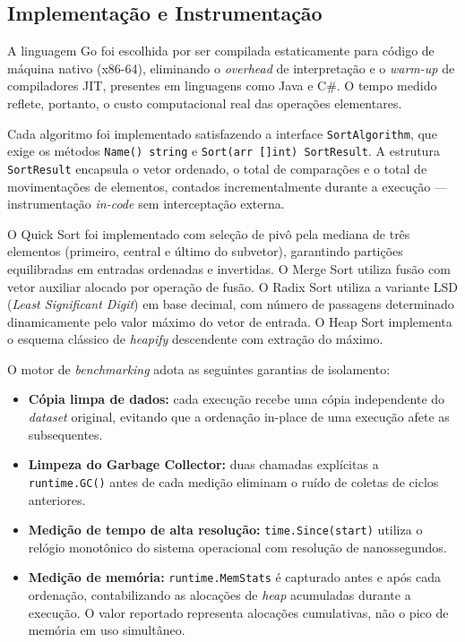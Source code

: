 \documentclass[12pt]{article}
\begin{document}
\subsection{Implementação e Instrumentação}
\label{subsec:impl}

A linguagem Go foi escolhida por ser compilada estaticamente para
código de máquina nativo (x86-64), eliminando o \textit{overhead}
de interpretação e o \textit{warm-up} de compiladores JIT,
presentes em linguagens como Java e C\#. O tempo medido reflete,
portanto, o custo computacional real das operações elementares.

Cada algoritmo foi implementado satisfazendo a interface
\texttt{SortAlgorithm}, que exige os métodos \texttt{Name() string}
e \texttt{Sort(arr []int) SortResult}. A estrutura \texttt{SortResult}
encapsula o vetor ordenado, o total de comparações e o total de
movimentações de elementos, contados incrementalmente durante a
execução --- instrumentação \textit{in-code} sem interceptação
externa.

O Quick Sort foi implementado com seleção de pivô pela mediana de
três elementos (primeiro, central e último do subvetor), garantindo
partições equilibradas em entradas ordenadas e invertidas. O Merge
Sort utiliza fusão com vetor auxiliar alocado por operação de fusão.
O Radix Sort utiliza a variante LSD (\textit{Least Significant
Digit}) em base decimal, com número de passagens determinado
dinamicamente pelo valor máximo do vetor de entrada. O Heap Sort
implementa o esquema clássico de \textit{heapify} descendente com
extração do máximo.

O motor de \textit{benchmarking} adota as seguintes garantias
de isolamento:

\begin{itemize}
  \item \textbf{Cópia limpa de dados:} cada execução recebe uma
        cópia independente do \textit{dataset} original, evitando
        que a ordenação in-place de uma execução afete as
        subsequentes.

  \item \textbf{Limpeza do Garbage Collector:} duas chamadas
        explícitas a \texttt{runtime.GC()} antes de cada medição
        eliminam o ruído de coletas de ciclos anteriores.

  \item \textbf{Medição de tempo de alta resolução:}
        \texttt{time.Since(start)} utiliza o relógio monotônico
        do sistema operacional com resolução de nanossegundos.

  \item \textbf{Medição de memória:} \texttt{runtime.MemStats}
        é capturado antes e após cada ordenação, contabilizando
        as alocações de \textit{heap} acumuladas durante a
        execução. O valor reportado representa alocações
        cumulativas, não o pico de memória em uso simultâneo.
\end{itemize}
\end{document}
